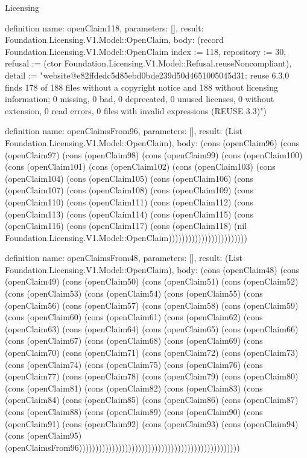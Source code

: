 \begin{lexlean}{Licensing}
\begin{semanticmodule}
definition{
  name: openClaim118,
  parameters: [],
  result: Foundation.Licensing.V1.Model::OpenClaim,
  body: (record Foundation.Licensing.V1.Model::OpenClaim {index := 118, repository := 30, refusal := (ctor Foundation.Licensing.V1.Model::Refusal.reuseNoncompliant), detail := "website@e82ffdedc5d85ebd0bde239d50d4651005045d31: reuse 6.3.0 finds 178 of 188 files without a copyright notice and 188 without licensing information; 0 missing, 0 bad, 0 deprecated, 0 unused licenses, 0 without extension, 0 read errors, 0 files with invalid expressions (REUSE 3.3)"})
}

definition{
  name: openClaimsFrom96,
  parameters: [],
  result: (List Foundation.Licensing.V1.Model::OpenClaim),
  body: (cons (openClaim96) (cons (openClaim97) (cons (openClaim98) (cons (openClaim99) (cons (openClaim100) (cons (openClaim101) (cons (openClaim102) (cons (openClaim103) (cons (openClaim104) (cons (openClaim105) (cons (openClaim106) (cons (openClaim107) (cons (openClaim108) (cons (openClaim109) (cons (openClaim110) (cons (openClaim111) (cons (openClaim112) (cons (openClaim113) (cons (openClaim114) (cons (openClaim115) (cons (openClaim116) (cons (openClaim117) (cons (openClaim118) (nil Foundation.Licensing.V1.Model::OpenClaim))))))))))))))))))))))))
}

definition{
  name: openClaimsFrom48,
  parameters: [],
  result: (List Foundation.Licensing.V1.Model::OpenClaim),
  body: (cons (openClaim48) (cons (openClaim49) (cons (openClaim50) (cons (openClaim51) (cons (openClaim52) (cons (openClaim53) (cons (openClaim54) (cons (openClaim55) (cons (openClaim56) (cons (openClaim57) (cons (openClaim58) (cons (openClaim59) (cons (openClaim60) (cons (openClaim61) (cons (openClaim62) (cons (openClaim63) (cons (openClaim64) (cons (openClaim65) (cons (openClaim66) (cons (openClaim67) (cons (openClaim68) (cons (openClaim69) (cons (openClaim70) (cons (openClaim71) (cons (openClaim72) (cons (openClaim73) (cons (openClaim74) (cons (openClaim75) (cons (openClaim76) (cons (openClaim77) (cons (openClaim78) (cons (openClaim79) (cons (openClaim80) (cons (openClaim81) (cons (openClaim82) (cons (openClaim83) (cons (openClaim84) (cons (openClaim85) (cons (openClaim86) (cons (openClaim87) (cons (openClaim88) (cons (openClaim89) (cons (openClaim90) (cons (openClaim91) (cons (openClaim92) (cons (openClaim93) (cons (openClaim94) (cons (openClaim95) (openClaimsFrom96)))))))))))))))))))))))))))))))))))))))))))))))))
}


\end{semanticmodule}
\end{lexlean}
